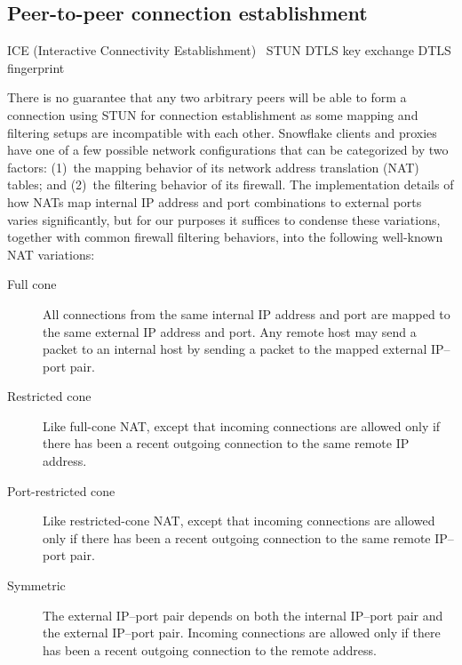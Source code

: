 \documentclass[letterpaper,twocolumn]{article}
\begin{document}
\subsection{Peer-to-peer connection establishment}
\label{sec:ice}

ICE (Interactive Connectivity Establishment)~\cite{rfc8445}
STUN
DTLS
key exchange
DTLS fingerprint~\cite[\S 5]{rfc8842}


There is no guarantee that any two arbitrary peers will be able to form
a connection using STUN for connection establishment as some mapping and
filtering setups are incompatible with each other.
Snowflake clients and proxies have one of a few possible
network configurations that can be categorized by two factors:
(1)~the mapping behavior of
its network address translation (NAT) tables; and
(2)~the filtering behavior of its firewall.
The implementation details of how NATs map internal IP address and port combinations
to external ports varies significantly, but for our purposes it suffices
to condense these variations, together with common firewall filtering behaviors,
into the following well-known NAT variations:

\begin{description}
\item[Full cone]
All connections from the same internal IP address
and port are mapped to the same external IP address and port. Any remote
host may send a packet to an internal host by sending a packet to the
mapped external IP--port pair.
\item[Restricted cone]
Like full-cone NAT,
except that incoming connections
are allowed only if
there has been a recent outgoing connection
to the same remote IP address.
\item[Port-restricted cone]
Like restricted-cone NAT,
except that incoming connections are allowed only if
there has been a recent outgoing connection
to the same remote IP--port pair.
\item[Symmetric]
The external IP--port pair depends on both
the internal IP--port pair and the external IP--port pair.
Incoming connections are allowed only if
there has been a recent outgoing
connection to the remote address.
\end{description}
\end{document}
